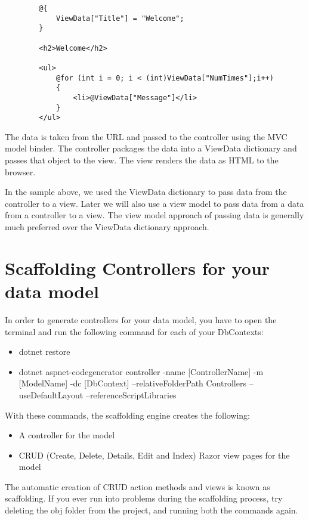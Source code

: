 \documentclass{report}
\begin{document}
    \lstset{style=sharpc}
    \begin{lstlisting}
        @{
            ViewData["Title"] = "Welcome";
        }

        <h2>Welcome</h2>

        <ul>
            @for (int i = 0; i < (int)ViewData["NumTimes"];i++)
            {
                <li>@ViewData["Message"]</li>
            }
        </ul>
    \end{lstlisting}

    The data is taken from the URL and passed to the controller using the MVC
    model binder. The controller packages the data into a ViewData dictionary
    and passes that object to the view. The view renders the data as HTML to the browser.

    In the sample above, we used the ViewData dictionary to pass data from the controller
    to a view. Later we will also use a view model to pass data from a data from a controller
    to a view. The view model approach of passing data is generally much preferred
    over the ViewData dictionary approach.

    \chapter{Scaffolding Controllers for your data model}
    In order to generate controllers for your data model, you have to open the terminal
    and run the following command for each of your DbContexts:
    \begin{itemize}
        \item dotnet restore
        \item dotnet aspnet-codegenerator controller -name [ControllerName] -m [ModelName] -dc [DbContext] --relativeFolderPath Controllers --useDefaultLayout --referenceScriptLibraries
    \end{itemize}

    With these commands, the scaffolding engine creates the following:
    \begin{itemize}
        \item A controller for the model
        \item CRUD (Create, Delete, Details, Edit and Index) Razor view pages
        for the model
    \end{itemize}
    
    The automatic creation of CRUD action methods and views is known as scaffolding.
    If you ever run into problems during the scaffolding process, try deleting the obj folder
    from the project, and running both the commands again.
\end{document}
